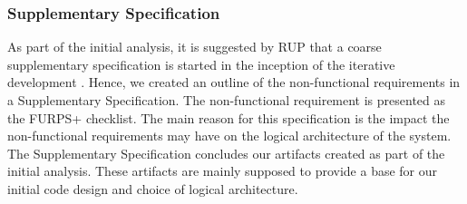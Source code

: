 \subsubsection{Supplementary Specification}
As part of the initial analysis, it is suggested by RUP that a coarse supplementary specification is started in the inception of the iterative development \cite[7.1 p.~102]{OOAD}. Hence, we created an outline of the non-functional requirements in a Supplementary Specification. The non-functional requirement is presented as the FURPS+ checklist. The main reason for this specification is the impact the non-functional requirements may have on the logical architecture of the system.\\
\newline
The Supplementary Specification concludes our artifacts created as part of the initial analysis. These artifacts are mainly supposed to provide a base for our initial code design and choice of logical architecture.\\